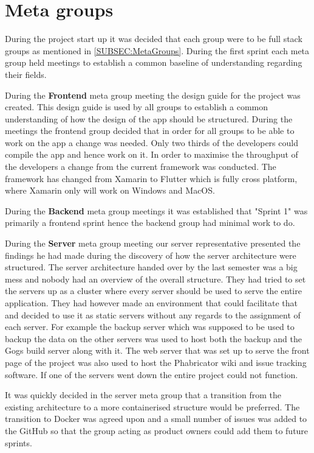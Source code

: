 \section{Meta groups}
During the project start up it was decided that each group were to be full stack groups as mentioned in \autoref{SUBSEC:MetaGroups}. 
During the first sprint each meta group held meetings to establish a common baseline of understanding regarding their fields. 

During the \textbf{Frontend} meta group meeting the design guide for the project was created. 
This design guide is used by all groups to establish a common understanding of how the design of the app should be structured. 
During the meetings the frontend group decided that in order for all groups to be able to work on the app a change was needed. 
Only two thirds of the developers could compile the app and hence work on it. 
In order to maximise the throughput of the developers a change from the current framework was conducted.
The framework has changed from Xamarin to Flutter which is fully cross platform, where Xamarin only will work on Windows and MacOS. 

During the \textbf{Backend} meta group meetings it was established that "Sprint 1" was primarily a frontend sprint hence the backend group had minimal work to do. 

During the \textbf{Server} meta group meeting our server representative presented the findings he had made during the discovery of how the server architecture were structured. 
The server architecture handed over by the last semester was a big mess and nobody had an overview of the overall structure.
They had tried to set the servers up as a cluster where every server should be used to serve the entire application. 
They had however made an environment that could facilitate that and decided to use it as static servers without any regards to the assignment of each server. 
For example the backup server which was supposed to be used to backup the data on the other servers was used to host both the backup and the Gogs build server along with it. 
The web server that was set up to serve the front page of the project was also used to host the Phabricator wiki and issue tracking software.
If one of the servers went down the entire project could not function. 

It was quickly decided in the server meta group that a transition from the existing architecture to a more containerised structure would be preferred. 
The transition to Docker was agreed upon and a small number of issues was added to the GitHub so that the group acting as product owners could add them to future sprints. 
